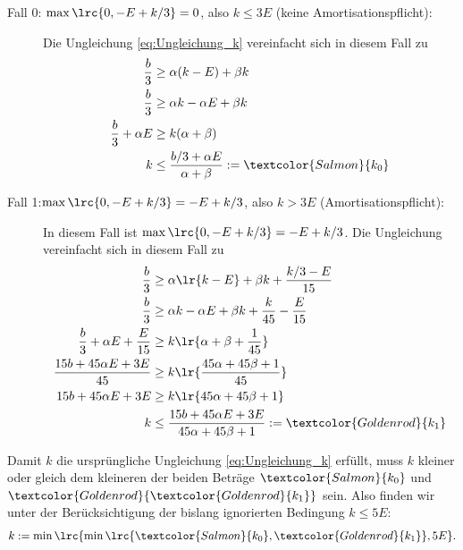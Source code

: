{\begin{myanswer}
\begin{enumerate}
			      \begin{description}
				      \item[Fall 0: $\max\lrc{0, -E + k/3} = 0$, also $k \leq 3E$ (keine Amortisationspflicht):] Die Ungleichung \ref{eq:Ungleichung_k} vereinfacht sich in diesem Fall zu
				            \begin{align*}
					            \frac{b}{3}            & \geq \alpha(k - E) + \beta k                                          \\
					            \frac{b}{3}            & \geq \alpha k - \alpha E + \beta k                                    \\
					            \frac{b}{3} + \alpha E & \geq k(\alpha + \beta)                                                \\
					            k                      & \leq \frac{b/3 + \alpha E}{\alpha + \beta} := \textcolor{Salmon}{k_0}
				            \end{align*}
				      \item[Fall 1:$\max\lrc{0, -E + k/3} = -E + k/3$, also $k > 3E$ (Amortisationspflicht):] In diesem Fall ist $\max\lrc{0, -E + k/3} = -E + k/3$. Die Ungleichung vereinfacht sich in diesem Fall zu
				            \begin{align*}
					            \frac{b}{3}                           & \geq \alpha\lr{k - E} + \beta k + \frac{k/3 - E}{15}                                    \\
					            \frac{b}{3}                           & \geq \alpha k - \alpha E + \beta k + \frac{k}{45} - \frac{E}{15}                        \\
					            \frac{b}{3} + \alpha E + \frac{E}{15} & \geq k\lr{\alpha + \beta + \frac{1}{45}}                                                \\
					            \frac{15b + 45\alpha E + 3E}{45}      & \geq k\lr{\frac{45\alpha + 45\beta + 1}{45}}                                            \\
					            15b + 45\alpha E + 3E                 & \geq k\lr{45\alpha + 45\beta + 1}                                                       \\
					            k                                     & \leq \frac{15b + 45\alpha E + 3E}{45\alpha + 45\beta + 1} := \textcolor{Goldenrod}{k_1}
				            \end{align*}
			      \end{description}
			      Damit $k$ die ursprüngliche Ungleichung \ref{eq:Ungleichung_k} erfüllt, muss $k$ kleiner oder gleich dem kleineren der beiden Beträge $\textcolor{Salmon}{k_0}$ und $\textcolor{Goldenrod}{\textcolor{Goldenrod}{k_1}}$ sein. Also finden wir unter der Berücksichtigung der bislang ignorierten Bedingung $k \leq 5E$:
			      \begin{align*}
				      k := \min\lrc{\min\lrc{\textcolor{Salmon}{k_0}, \textcolor{Goldenrod}{k_1}}, 5E}.
			      \end{align*}


\end{enumerate}
\end{myanswer}}
